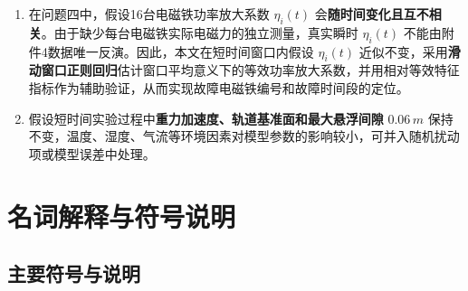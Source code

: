 \documentclass[a4paper]{nmmcm}
\begin{document}
\begin{enumerate}
  \item 在问题四中，假设16台电磁铁功率放大系数 $\eta_i(t)$ 会\textbf{随时间变化且互不相关}。由于缺少每台电磁铁实际电磁力的独立测量，真实瞬时 $\eta_i(t)$ 不能由附件4数据唯一反演。因此，本文在短时间窗口内假设 $\eta_i(t)$ 近似不变，采用\textbf{滑动窗口正则回归}估计窗口平均意义下的等效功率放大系数，并用相对等效特征指标作为辅助验证，从而实现故障电磁铁编号和故障时间段的定位。

  \item 假设短时间实验过程中\textbf{重力加速度、轨道基准面和最大悬浮间隙} $0.06\,m$ 保持不变，温度、湿度、气流等环境因素对模型参数的影响较小，可并入随机扰动项或模型误差中处理。
\end{enumerate}

\section{名词解释与符号说明}

\subsection{主要符号与说明}
\end{document}
